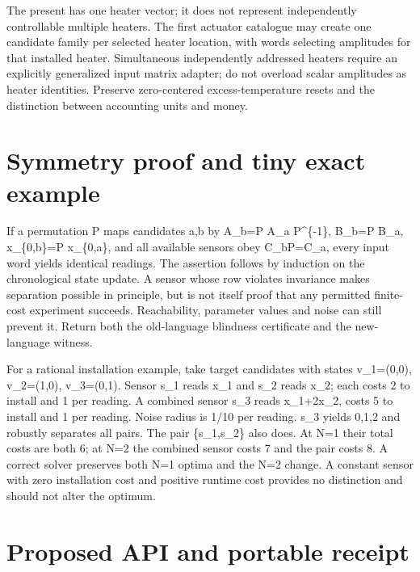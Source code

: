 \documentclass[
  11pt,
  a4paper,
]{report}
\let\nxtexttt\texttt
\renewcommand{\texttt}[1]{\nxtexttt{\seqsplit{#1}}}
\begin{document}
The present \texttt{AffineCandidate} has one heater vector; it does not
represent independently controllable multiple heaters. The first
actuator catalogue may create one candidate family per selected heater
location, with words selecting amplitudes for that installed heater.
Simultaneous independently addressed heaters require an explicitly
generalized input matrix adapter; do not overload scalar amplitudes as
heater identities. Preserve zero-centered excess-temperature resets and
the distinction between accounting units and money.

\hypertarget{symmetry-proof-and-tiny-exact-example}{%
\section{Symmetry proof and tiny exact
example}\label{symmetry-proof-and-tiny-exact-example}}

If a permutation P maps candidates a,b by A\_b=P A\_a P\^{}\{-1\},
B\_b=P B\_a, x\_\{0,b\}=P x\_\{0,a\}, and all available sensors obey
C\_bP=C\_a, every input word yields identical readings. The assertion
follows by induction on the chronological state update. A sensor whose
row violates invariance makes separation possible in principle, but is
not itself proof that any permitted finite-cost experiment succeeds.
Reachability, parameter values and noise can still prevent it. Return
both the old-language blindness certificate and the new-language
witness.

For a rational installation example, take target candidates with states
v\_1=(0,0), v\_2=(1,0), v\_3=(0,1). Sensor s\_1 reads x\_1 and s\_2
reads x\_2; each costs 2 to install and 1 per reading. A combined sensor
s\_3 reads x\_1+2x\_2, costs 5 to install and 1 per reading. Noise
radius is 1/10 per reading. s\_3 yields 0,1,2 and robustly separates all
pairs. The pair \{s\_1,s\_2\} also does. At N=1 their total costs are
both 6; at N=2 the combined sensor costs 7 and the pair costs 8. A
correct solver preserves both N=1 optima and the N=2 change. A constant
sensor with zero installation cost and positive runtime cost provides no
distinction and should not alter the optimum.

\hypertarget{proposed-api-and-portable-receipt}{%
\section{Proposed API and portable
receipt}\label{proposed-api-and-portable-receipt}}
\end{document}

